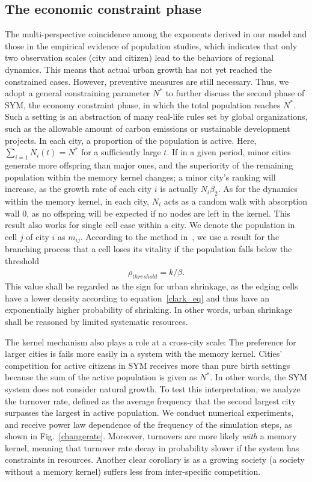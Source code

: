 \subsection{The economic constraint phase}

The multi-perspective coincidence among the exponents derived in our model and those in the empirical evidence of population studies, which indicates that only two observation scales (city and citizen) lead to the behaviors of regional dynamics. This means that actual urban growth has not yet reached the constrained cases. However, preventive measures are still necessary. Thus, we adopt a general constraining parameter $N^*$ to further discuss the second phase of SYM, the economy constraint phase, in which the total population reaches $N^*$. Such a setting is an abstraction of many real-life rules set by global organizations, such as the allowable amount of carbon emissions or sustainable development projects. In each city, a proportion of the population is active. Here, $\sum_{i=1} N_i(t) = N^*$ for a sufficiently large $t$. If in a given period, minor cities generate more offspring than major ones, and the superiority of the remaining population within the memory kernel changes; a minor city's ranking will increase, as the growth rate of each city $i$ is actually $N_i\beta_2$. As for the dynamics within the memory kernel, in each city, $N_i$ acts as a random walk with absorption wall $0$, as no offspring will be expected if no nodes are left in the kernel. This result also works for single cell case within a city. We denote the population in cell $j$ of city $i$ as $m_{ij}$. According to the method in~\cite{durrett1999essentials}, we use a result for the branching process that a cell loses its vitality if the population falls below the threshold \begin{align}\rho_{threshold} = k/\beta.\end{align} This value shall be regarded as the sign for urban shrinkage, as the edging cells have a lower density according to equation~\ref{clark_eq} and thus have an exponentially higher probability of shrinking. In other words, urban shrinkage shall be reasoned by limited systematic resources. 

The kernel mechanism also plays a role at a cross-city scale: The preference for larger cities is fails more easily in a system with the memory kernel. Cities' competition for active citizens in SYM receives more than pure birth settings because the sum of the active population is given as $N^*$. In other words, the SYM system does not consider natural growth. To test this interpretation, we analyze the turnover rate, defined as the average frequency that the second largest city surpasses the largest in active population. We conduct numerical experiments, and receive power law dependence of the frequency of the simulation steps, as shown in Fig.~\ref{changerate}. Moreover, turnovers are more likely \textit{with} a memory kernel, meaning that turnover rate decay in probability slower if the system has constraints in resources. Another clear corollary is as a growing society (a society without a memory kernel) suffers less from inter-specific competition.

